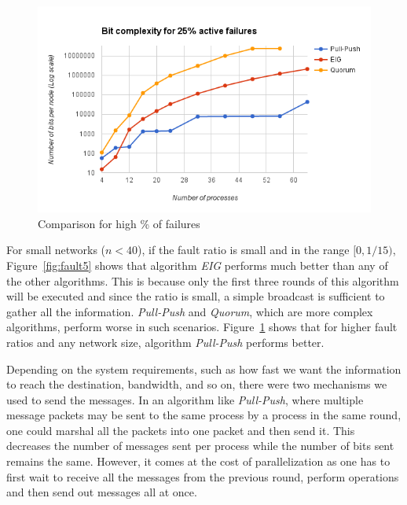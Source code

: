 \begin{figure}[ht] \centering 
    \includegraphics[scale=0.4]{Fault25}  \caption{Comparison for
    high \% of failures} \label{fig:fault25} 
    \vspace{-4mm}
\end{figure}

For small networks ($n < 40$), if the fault ratio is small and in the range
$[0, 1/15)$, Figure~\ref{fig:fault5} shows that algorithm \textit{EIG} performs
    much better than any of the other algorithms. This is because only
    the first three rounds of this algorithm will be executed and since the
    ratio is small, a simple broadcast is sufficient to gather all the
    information. \textit{Pull-Push} and \textit{Quorum}, which are more complex
    algorithms, perform worse in such scenarios. Figure~\ref{fig:fault25} shows that for higher fault ratios
    and any network size, algorithm \textit{Pull-Push} performs better.

    Depending on the system requirements, such as how fast we want the
    information to reach the destination, bandwidth, and so on, there were two
    mechanisms we used to send the messages. In an algorithm like
    \textit{Pull-Push}, where multiple message packets may be sent to the same
    process by a process in the same round, one could marshal all the packets
    into one packet and then send it. This decreases the number of messages
    sent per process while the number of bits sent remains the same. However,
    it comes at the cost of parallelization as one has to first wait to receive
    all the messages from the previous round, perform operations and then send
    out messages all at once. 


